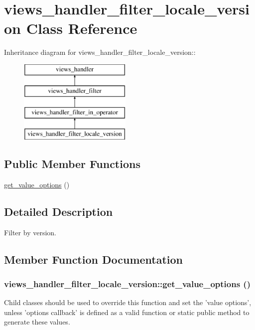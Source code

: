 \hypertarget{classviews__handler__filter__locale__version}{
\section{views\_\-handler\_\-filter\_\-locale\_\-version Class Reference}
\label{classviews__handler__filter__locale__version}
}
Inheritance diagram for views\_\-handler\_\-filter\_\-locale\_\-version::\begin{figure}[H]
\begin{center}
\leavevmode
\includegraphics[height=4cm]{classviews__handler__filter__locale__version}
\end{center}
\end{figure}
\subsection*{Public Member Functions}
\begin{DoxyCompactItemize}
\item 
\hyperlink{classviews__handler__filter__locale__version_af0f2577c03733a4f9d1cd2d931329edd}{get\_\-value\_\-options} ()
\end{DoxyCompactItemize}


\subsection{Detailed Description}
Filter by version. 

\subsection{Member Function Documentation}
\hypertarget{classviews__handler__filter__locale__version_af0f2577c03733a4f9d1cd2d931329edd}{
\subsubsection[{get\_\-value\_\-options}]{\setlength{\rightskip}{0pt plus 5cm}views\_\-handler\_\-filter\_\-locale\_\-version::get\_\-value\_\-options ()}}
\label{classviews__handler__filter__locale__version_af0f2577c03733a4f9d1cd2d931329edd}
Child classes should be used to override this function and set the 'value options', unless 'options callback' is defined as a valid function or static public method to generate these values.

